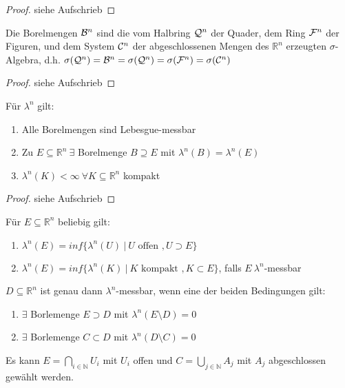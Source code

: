 \documentclass[11pt,a4paper,fleqn,openany]{report}
\begin{document}
    \begin{proof}
      siehe Aufschrieb
    \end{proof}


    \begin{lemma}
      Die Borelmengen $\mathcal{B}^n$ sind die vom Halbring $\mathcal{Q}^n$ der Quader, dem Ring $\mathcal{F}^n$ der Figuren, und dem System $\mathcal{C}^n$ der abgeschlossenen Mengen des $\mathbb{R}^n$ erzeugten $\sigma$-Algebra, d.h. $\sigma(\mathcal{Q}^n) = \mathcal{B}^n = \sigma(\mathcal{Q}^n) = \sigma(\mathcal{F}^n) = \sigma(\mathcal{C}^n)$
    \end{lemma}

    \begin{proof}
      siehe Aufschrieb
    \end{proof}

    \begin{theorem}
      Für $\lambda^n$ gilt:
      \begin{enumerate}
        \item Alle Borelmengen sind Lebesgue-messbar 
        \item Zu $E \subseteq \mathbb{R}^n \ \exists$ Borelmenge $B \supseteq E$ mit $\lambda^n(B) = \lambda^n(E)$
        \item $\lambda^n(K) < \infty \ \forall K \subseteq \mathbb{R}^n$ kompakt
      \end{enumerate}
    \end{theorem}

    \begin{proof}
      siehe Aufschrieb
    \end{proof}

    \begin{lemma}
      Für $E \subseteq \mathbb{R}^n$ beliebig gilt:
      \begin{enumerate}[label=\roman*)]
        \item $\lambda^n(E) = inf\{\lambda^n(U) \ | \ U \text{ offen }, U \supset E\}$
        \item $\lambda^n(E) = inf\{\lambda^n(K) \ | \ K \text{ kompakt }, K \subset E\}$, falls $E \ \lambda^n$-messbar
      \end{enumerate}
    \end{lemma}

    \begin{theorem}
      $D \subseteq \mathbb{R}^n$ ist genau dann $\lambda^n$-messbar, wenn eine der beiden Bedingungen gilt:
      \begin{enumerate}[label=\roman*)]
        \item $\exists$ Borlemenge $E \supset D$ mit $\lambda^n(E \setminus D) = 0$
        \item $\exists$ Borlemenge $C \subset D$ mit $\lambda^n(D \setminus C) = 0$
      \end{enumerate}
      Es kann $E = \bigcap\limits_{i \in \mathbb{N}} U_i$ mit $U_i$ offen und $C = \bigcup\limits_{j \in \mathbb{N}} A_j$ mit $A_j$ abgeschlossen gewählt werden.
    \end{theorem}
\end{document}
